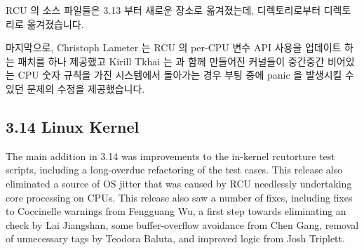 RCU 의 소스 파일들은 3.13 부터 새로운 장소로 옮겨졌는데, 
디렉토리로부터  디렉토리로 옮겨졌습니다.

마지막으로, Christoph Lameter 는 RCU 의 per-CPU 변수 API 사용을 업데이트 하는
패치를 하나 제공했고 Kirill Tkhai 는  과 함께
만들어진 커널들이 중간중간 비어있는 CPU 숫자 규칙을 가진 시스템에서 돌아가는
경우 부팅 중에 panic 을 발생시킬 수 있던 문제의 수정을 제공했습니다.

\subsection{3.14 Linux Kernel}

The main addition in 3.14 was improvements to the in-kernel rcutorture
test scripts, including a long-overdue refactoring of the test cases.
This release also eliminated a source of OS jitter that was caused
by RCU needlessly undertaking core processing on  CPUs.
This release also saw a number of fixes, including fixes to Coccinelle
warnings from Fengguang Wu, a first step towards eliminating an
 check by Lai Jiangshan, some buffer-overflow
avoidance from Chen Gang, removal of unnecessary  tags by
Teodora Baluta, and improved  logic from
Josh Triplett.
